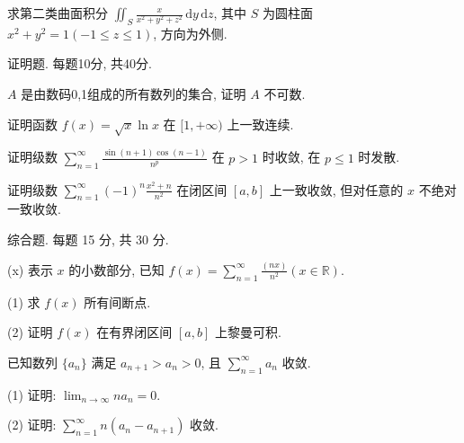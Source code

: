 求第二类曲面积分 $\iint_{S} \frac{x}{x^2 + y^2 + z^2} \, \mathrm{d}y \, \mathrm{d}z$, 其中 $S$ 为圆柱面 $x^2 + y^2 = 1 (-1 \leq z \leq 1)$, 方向为外侧.\par
\par{}
证明题. 每题10分, 共40分.\par
$A$ 是由数码0,1组成的所有数列的集合, 证明 $A$ 不可数.\par
证明函数 $f(x) = \sqrt{x} \ln x$ 在 $[1, +\infty)$ 上一致连续.\par
证明级数 $\sum_{n=1}^{\infty} \frac{\sin(n+1) \cos(n-1)}{n^p}$ 在 $p > 1$ 时收敛, 在 $p \leq 1$ 时发散.\par
证明级数 $\sum_{n=1}^{\infty} (-1)^{n} \frac{x^{2} + n}{n^{2}}$ 在闭区间 $[a, b]$ 上一致收敛, 但对任意的 $x$ 不绝对一致收敛.\par
\par{}
综合题. 每题 15 分, 共 30 分.\par
(x) 表示 $x$ 的小数部分, 已知 $f(x) = \sum_{n=1}^{\infty} \frac{(nx)}{n^2} (x \in \mathbb{R})$.\par
(1) 求 $f(x)$ 所有间断点.\par
(2) 证明 $f(x)$ 在有界闭区间 $[a, b]$ 上黎曼可积.\par
已知数列 $\{a_{n}\}$ 满足 $a_{n+1} > a_{n} > 0$, 且 $\sum_{n=1}^{\infty} a_{n}$ 收敛.\par
(1) 证明: $\lim_{n\to \infty}na_n = 0.$\par
(2) 证明: $\sum_{n=1}^{\infty} n(a_n - a_{n+1})$ 收敛.\par
